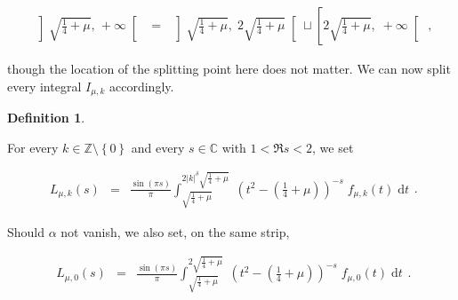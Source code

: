 \documentclass{jams-l}
\theoremstyle{definition}
\newtheorem{definition}[theorem]{Definition}
\theoremstyle{remark}
\numberwithin{equation}{section}
\begin{document}
        \begin{equation}
        \label{EqSplittingk0}
            \begin{array}{lll}
                \left] \sqrt{\frac{1}{4} + \mu}, \, + \infty \right[ & = & \left] \sqrt{\frac{1}{4} + \mu}, \; 2 \sqrt{\frac{1}{4} + \mu} \right[ \sqcup \left[ 2 \sqrt{\frac{1}{4} + \mu}, \; +\infty \right[
            \end{array} ,
        \end{equation}
        
        \noindent though the location of the splitting point here does not matter. We can now split every integral $I_{\mu,k}$ accordingly.
        
        \begin{definition}
        \label{DefLmuk}
        
            For every $k \in \mathbb{Z} \setminus \left \{ 0 \right \}$ and every $s \in \mathbb{C}$ with $1 < \Re s < 2$, we set
            
            \[ \begin{array}{lll}
                    L_{\mu,k} \left( s \right) & = & \displaystyle \frac{\sin \left( \pi s \right)}{\pi} \int_{\sqrt{\frac{1}{4}+\mu}}^{2 \left \vert k \right \vert^{\delta} \sqrt{\frac{1}{4} + \mu}} \; \left( t^2 - \left( \frac{1}{4} + \mu \right) \right)^{-s} \; f_{\mu,k} \left( t \right) \; \text{d}t
                \end{array} . \]
            
            \noindent Should $\alpha$ not vanish, we also set, on the same strip,
            
            \[ \begin{array}{lll}
                    L_{\mu,0} \left( s \right) & = & \displaystyle \frac{\sin \left( \pi s \right)}{\pi} \int_{\sqrt{\frac{1}{4}+\mu}}^{2 \sqrt{\frac{1}{4} + \mu}} \; \left( t^2 - \left( \frac{1}{4} + \mu \right) \right)^{-s} \; f_{\mu,0} \left( t \right) \; \text{d}t
                \end{array} . \]
        
        \end{definition}
        
\end{document}

